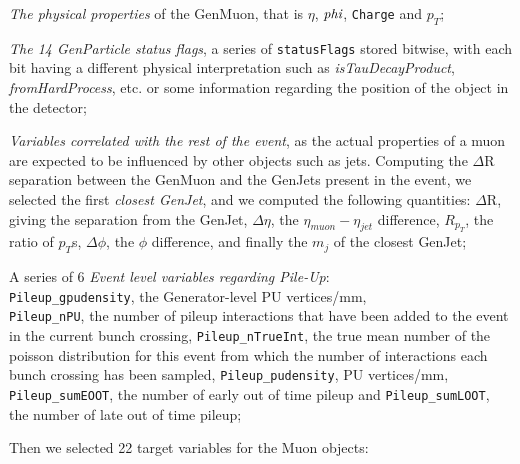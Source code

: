 \begin{outline}
\1 \emph{The physical properties} of the GenMuon, that is $\eta$, $\emph{phi}$, \texttt{Charge} and $p_T$;

\1 \emph{The 14 GenParticle status flags}, a series of \texttt{statusFlags} stored bitwise, with each bit having a different physical interpretation such as \emph{isTauDecayProduct}, \emph{fromHardProcess}, etc. or some information regarding the position of the object in the detector;

\1 \emph{Variables correlated with the rest of the event}, as the actual properties of a muon are expected to be influenced by other objects such as jets. Computing the $\Delta$R separation between the GenMuon and the GenJets present in the event, we selected the first \emph{closest GenJet}, and we computed the following quantities:
\2 $\Delta$R, giving the separation from the GenJet, $\Delta\eta$, the $\eta_{muon} - \eta_{jet}$ difference, $R_{p_T}$, the ratio of $p_T$s, $\Delta\phi$, the $\phi$ difference, and finally the $m_j$ of the closest GenJet;

\1 A series of 6 \emph{ Event level variables regarding Pile-Up}:\\ \texttt{Pileup\_gpudensity}, the Generator-level PU vertices/mm,\\ \texttt{Pileup\_nPU}, the number of pileup interactions that have been added to the event in the current bunch crossing, \texttt{Pileup\_nTrueInt}, the true mean number of the poisson distribution for this event from which the number of interactions each bunch crossing has been sampled, \texttt{Pileup\_pudensity}, PU vertices/mm, \texttt{Pileup\_sumEOOT}, the number of early out of time pileup and \texttt{Pileup\_sumLOOT}, the number of late out of time pileup;
\end{outline}

Then we selected 22 target variables for the Muon objects:

